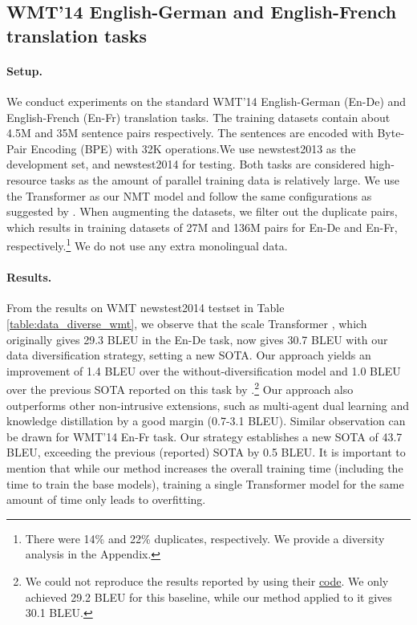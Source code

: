 \documentclass{article}
\begin{document}
\subsection{WMT'14 English-German and English-French translation tasks}\label{sec:wmt}

\paragraph{Setup.} {We conduct experiments on the standard WMT'14 English-German (En-De) and English-French (En-Fr) translation tasks. The training datasets contain about 4.5M and 35M sentence pairs respectively. 
{The sentences are encoded with Byte-Pair Encoding (BPE) \citep{sennrich2015neural} with 32K operations.}We use newstest2013 as the development set, and newstest2014 for testing. {Both tasks are considered high-resource tasks as the amount of parallel training data is relatively large.} 
We use the Transformer \citep{vaswani2017attention} as our NMT model and follow the same configurations as suggested by \citet{scaling_nmt_ott2018scaling}.
When augmenting the datasets, we filter out the duplicate pairs, which results in training datasets of 27M and 136M pairs for En-De and En-Fr, respectively.\footnote{There were 14\% and 22\% duplicates, respectively. 
We provide a diversity analysis in the Appendix.} We do {not} use any extra monolingual data. 
}









\vspace{-0.5em}
\paragraph{Results.} From the results on WMT newstest2014 testset in Table \ref{table:data_diverse_wmt}, we observe that the scale Transformer \citep{scaling_nmt_ott2018scaling}, which originally gives 29.3 BLEU in the En-De task, now gives 30.7 BLEU with our data diversification  strategy, setting a new SOTA. Our approach yields an improvement of 1.4 BLEU over the without-diversification model and 1.0 BLEU over the previous SOTA reported on this task by \citet{payless_wu2018}.\footnote{We could not {reproduce} the results reported by \citet{payless_wu2018} using their \href{https://github.com/pytorch/fairseq/tree/master/examples/pay_less_attention_paper\#wmt16-en-de}{code}. We only achieved 29.2 BLEU for this baseline, while our method applied to it gives 30.1 BLEU.} Our approach also outperforms other non-intrusive extensions, such as multi-agent dual learning and knowledge distillation by a good margin (0.7-3.1 BLEU).
Similar observation can be drawn for WMT'14 En-Fr task. Our strategy establishes a new SOTA of 43.7 BLEU, exceeding the previous (reported) SOTA by 0.5 BLEU. It is important to mention that while our method increases the overall training time (including the time to train the base models), training a single Transformer model for the same amount of time only leads to overfitting.
\end{document}
